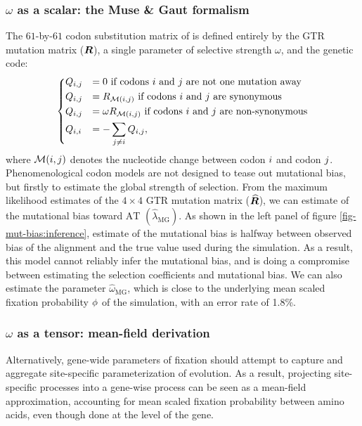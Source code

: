 \subsubsection{$\omega$ as a scalar: the Muse \& Gaut formalism}

The $61$-by-$61$ codon substitution matrix of \citet{Muse1994} is defined entirely by the GTR mutation matrix ($\bm{R}$), a single parameter of selective strength $\omega$, and the genetic code:
\begin{equation}
    \begin{dcases}
        Q_{{i}, {j}} & = 0 \text{ if codons ${i}$ and ${j}$ are not one mutation away} \\
        Q_{{i}, {j}} & = R_{\mathcal{M}({i}, {j})} \text{ if codons ${i}$ and ${j}$ are synonymous} \\
        Q_{{i}, {j}} & = \omega R_{\mathcal{M}({i}, {j})} \text{ if codons ${i}$ and ${j}$ are non-synonymous} \\
        Q_{{i}, {i}} & = - \sum\limits_{{j} \neq {i}} Q_{{i}, {j}},
    \end{dcases}
    \label{eq:codon-muse-gaut}
\end{equation}
where $\mathcal{M}({i}, {j})$ denotes the nucleotide change between codon ${i}$ and codon ${j}$.
Phenomenological codon models are not designed to tease out mutational bias, but firstly to estimate the global strength of selection.
From the maximum likelihood estimates of the $4 \times 4$ GTR mutation matrix ($\widehat{\bm{R}}$), we can estimate of the mutational bias toward $\mathrm{AT}$ $\left({\widehat{\lambda}_{\text{MG}}} \right)$.
As shown in the left panel of figure \ref{fig-mut-bias:inference}, estimate of the mutational bias is halfway between observed bias of the alignment and the true value used during the simulation.
As a result, this model cannot reliably infer the mutational bias, and is doing a compromise between estimating the selection coefficients and mutational bias.
We can also estimate the parameter ${\widehat{\omega}_{\text{MG}}}$, which is close to the underlying mean scaled fixation probability $\phi$ of the simulation, with an error rate of 1.8\%.

\subsubsection{$\omega$ as a tensor: mean-field derivation}

Alternatively, gene-wide parameters of fixation should attempt to capture and aggregate site-specific parameterization of evolution.
As a result, projecting site-specific processes into a gene-wise process can be seen as a mean-field approximation, accounting for mean scaled fixation probability between amino acids, even though done at the level of the gene.

